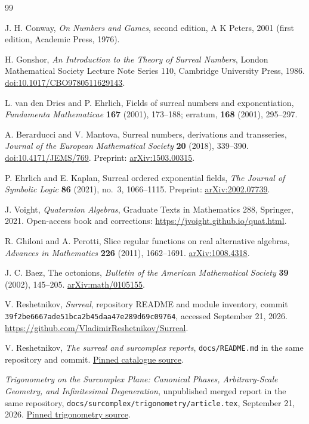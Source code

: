 \documentclass[11pt,letterpaper]{article}
\numberwithin{equation}{section}
\theoremstyle{definition}
\theoremstyle{remark}
\begin{document}
\begingroup
\small
\raggedright
\begin{thebibliography}{99}
\setlength{\itemsep}{0.35em}

J. H. Conway, \emph{On Numbers and Games}, second edition, A K Peters, 2001
(first edition, Academic Press, 1976).

H. Gonshor, \emph{An Introduction to the Theory of Surreal Numbers}, London Mathematical
Society Lecture Note Series 110, Cambridge University Press, 1986.
\href{https://doi.org/10.1017/CBO9780511629143}{doi:10.1017/CBO9780511629143}.

L. van den Dries and P. Ehrlich, Fields of surreal numbers and exponentiation,
\emph{Fundamenta Mathematicae} \textbf{167} (2001), 173--188;
erratum, \textbf{168} (2001), 295--297.

A. Berarducci and V. Mantova, Surreal numbers, derivations and transseries,
\emph{Journal of the European Mathematical Society} \textbf{20} (2018), 339--390.
\href{https://doi.org/10.4171/JEMS/769}{doi:10.4171/JEMS/769}.
Preprint: \href{https://arxiv.org/abs/1503.00315}{arXiv:1503.00315}.

P. Ehrlich and E. Kaplan, Surreal ordered exponential fields,
\emph{The Journal of Symbolic Logic} \textbf{86} (2021), no.~3, 1066--1115.
Preprint: \href{https://arxiv.org/abs/2002.07739}{arXiv:2002.07739}.

J. Voight, \emph{Quaternion Algebras}, Graduate Texts in Mathematics 288, Springer, 2021.
Open-access book and corrections:
\url{https://jvoight.github.io/quat.html}.

R. Ghiloni and A. Perotti, Slice regular functions on real alternative algebras,
\emph{Advances in Mathematics} \textbf{226} (2011), 1662--1691.
\href{https://arxiv.org/abs/1008.4318}{arXiv:1008.4318}.

J. C. Baez, The octonions, \emph{Bulletin of the American Mathematical Society}
\textbf{39} (2002), 145--205.
\href{https://arxiv.org/abs/math/0105155}{arXiv:math/0105155}.

V. Reshetnikov, \emph{Surreal}, repository README and module inventory,
commit \texttt{39f2be6667ade51bca2b45daa47e289d69c09764}, accessed September 21, 2026.
\url{https://github.com/VladimirReshetnikov/Surreal}.

V. Reshetnikov, \emph{The surreal and surcomplex reports},
\texttt{docs/README.md} in the same repository and commit.
\href{https://github.com/VladimirReshetnikov/Surreal/blob/39f2be6667ade51bca2b45daa47e289d69c09764/docs/README.md}{Pinned catalogue source}.

\emph{Trigonometry on the Surcomplex Plane: Canonical Phases, Arbitrary-Scale Geometry,
and Infinitesimal Degeneration}, unpublished merged report in the same repository,
\texttt{docs/surcomplex/trigonometry/article.tex}, September 21, 2026.
\href{https://github.com/VladimirReshetnikov/Surreal/blob/39f2be6667ade51bca2b45daa47e289d69c09764/docs/surcomplex/trigonometry/article.tex}{Pinned trigonometry source}.

\end{thebibliography}
\endgroup
\end{document}
